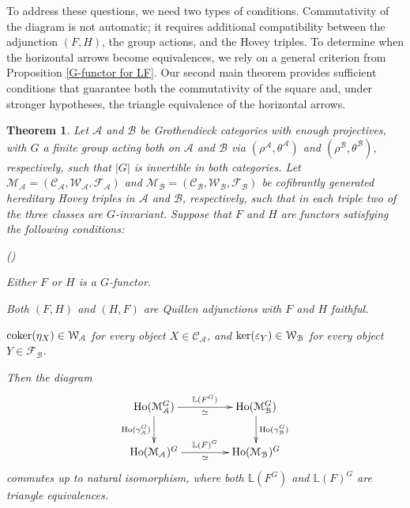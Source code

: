 \documentclass[12pt,twoside]{amsart}
\newtheorem{intthm}{Theorem}[]
\theoremstyle{bfupright head,slanted body}
\theoremstyle{bfupright head,upright body}
\theoremstyle{fixed bf head,slanted body}
\theoremstyle{fixed bf head,upright body}
\theoremstyle{numbered paragraph}
\newlength{\thmlistleft}        %
\newlength{\thmlistright}       %
\newlength{\thmlistpartopsep}   %
\newlength{\thmlisttopsep}      %
\newlength{\thmlistparsep}      %
\newlength{\thmlistitemsep}     %
\newcounter{prt}
\newenvironment{prt}{\begin{list}{\upshape (\alph{prt})}%
    {\usecounter{prt}%
      \setlength{\leftmargin}{\thmlistleft}%
      \setlength{\labelwidth}{\thmlistleft}%
      \setlength{\rightmargin}{\thmlistright}%
      \setlength{\partopsep}{\thmlistpartopsep}%
      \setlength{\topsep}{\thmlisttopsep}%
      \setlength{\parsep}{\thmlistparsep}%
      \setlength{\itemsep}{\thmlistitemsep}}}%
  {\end{list}}%
\numberwithin{equation}{res}
\newcommand{\Ho}{\mathrm{Ho}}
\newcommand{\cok}{\mbox{\rm coker}}
\newcommand{\kernel}{\mbox{\rm ker}}
\begin{document}
To address these questions, we need two types of conditions.
Commutativity of the diagram is not automatic; it requires additional compatibility between the adjunction \((F,H)\), the group actions, and the Hovey triples.
To determine when the horizontal arrows become equivalences, we rely on a general criterion from Proposition \ref{G-functor for LF}.
Our second main theorem provides sufficient conditions that guarantee both the commutativity of the square and, under stronger hypotheses, the triangle equivalence of the horizontal arrows.

\begin{intthm} \label{thmB homotopy square}
Let \(\mathcal A\) and \(\mathcal B\) be Grothendieck categories with enough projectives, with \(G\) a finite group acting both on \(\mathcal A\) and \(\mathcal B\) via \((\rho^{\mathcal A}, \theta^{\mathcal A})\) and \((\rho^{\mathcal B}, \theta^{\mathcal B})\), respectively, such that \(|G|\) is invertible in both categories. Let \(\mathcal M_{\mathcal A} = (\mathcal C_{\mathcal A}, \mathcal W_{\mathcal A}, \mathcal F_{\mathcal A})\) and \(\mathcal M_{\mathcal B} = (\mathcal C_{\mathcal B}, \mathcal W_{\mathcal B}, \mathcal F_{\mathcal B})\) be cofibrantly generated hereditary Hovey triples in \(\mathcal A\) and \(\mathcal B\), respectively, such that in each triple two of the three classes are \(G\)-invariant. Suppose that \(F\) and \(H\) are functors satisfying the following conditions:
\begin{prt}
\item Either \(F\) or \(H\) is a \(G\)-functor.
\item Both \((F, H)\) and \((H, F)\) are Quillen adjunctions with \(F\) and \(H\) faithful.
\item \(\cok(\eta_X) \in \mathcal W_{\mathcal A}\) for every object \(X \in \mathcal C_{\mathcal A}\), and \(\kernel(\varepsilon_Y) \in \mathcal W_{\mathcal B}\) for every object \(Y \in \mathcal F_{\mathcal B}\).
\end{prt}
Then the diagram
\[
\xymatrix@C=1.5CM{
   \Ho(\mathcal M_{\mathcal A}^G)  \ar[d]_-{\Ho(\gamma_{\mathcal A}^G)}^-{ }  \ar[r]^-{\mathbb{L}(F^G)}_-{\simeq}
&  \Ho(\mathcal M_{\mathcal B}^G)  \ar[d]^-{\Ho(\gamma_{\mathcal B}^G)}_-{ }             \\
   \Ho(\mathcal M_{\mathcal A})^G                                \ar[r]^-{\mathbb{L}(F)^G}_-{\simeq}
&  \Ho(\mathcal M_{\mathcal B})^G                                            }
\]
commutes up to natural isomorphism, where both \(\mathbb{L}(F^G)\) and \(\mathbb{L}(F)^G\) are triangle equivalences.
\end{intthm}
\end{document}
